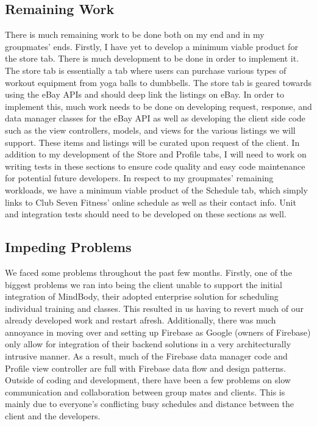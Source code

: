 \documentclass[a4paper]{article}
\begin{document}
\subsection{Remaining Work}

There is much remaining work to be done both on my end and in my groupmates' ends. Firstly, I have yet to develop a minimum viable product for the store tab. There is much development to be done in order to implement it. The store tab is essentially a tab where users can purchase various types of workout equipment from yoga balls to dumbbells. The store tab is geared towards using the eBay APIs and should deep link the listings on eBay. In order to implement this, much work needs to be done on developing request, response, and data manager classes for the eBay API as well as developing the client side code such as the view controllers, models, and views for the various listings we will support. These items and listings will be curated upon request of the client. In addition to my development of the Store and Profile tabs, I will need to work on writing tests in these sections to ensure code quality and easy code maintenance for potential future developers. In respect to my groupmates' remaining workloads, we have a minimum viable product of the Schedule tab, which simply links to Club Seven Fitness' online schedule as well as their contact info. Unit and integration tests should need to be developed on these sections as well.

\subsection{Impeding Problems}

We faced some problems throughout the past few months. Firstly, one of the biggest problems we ran into being the client unable to support the initial integration of MindBody, their adopted enterprise solution for scheduling individual training and classes. This resulted in us having to revert much of our already developed work and restart afresh. Additionally, there was much annoyance in moving over and setting up Firebase as Google (owners of Firebase) only allow for integration of their backend solutions in a very architecturally intrusive manner. As a result, much of the Firebase data manager code and Profile view controller are full with Firebase data flow and design patterns. Outside of coding and development, there have been a few problems on slow communication and collaboration between group mates and clients. This is mainly due to everyone's conflicting busy schedules and distance between the client and the developers.
\end{document}
